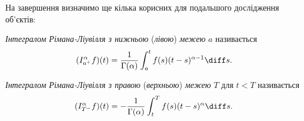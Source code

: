 На завершення визначимо ще кілька корисних для подальшого дослідження об'єктів:
\begin{definition}
    \textit{Інтегралом Рімана-Ліувілля з нижньою }(\textit{лівою})\textit{ межею} $a$ називається
    \begin{equation}
        (I_{a^+}^\alpha f)(t) = \frac{1}{\Gamma(\alpha)} \int_a^t f(s) (t - s)^{\alpha - 1} \diff s.
    \end{equation}
\end{definition}
\begin{definition}
    \textit{Інтегралом Рімана-Ліувілля з правою }(\textit{верхньою})\textit{ межею} $T$ для $t < T$ називається
    \begin{equation}
        (I_{T^-}^\alpha f)(t) = -\frac{1}{\Gamma(\alpha)} \int_t^T f(s) (t - s)^\alpha \diff s.
    \end{equation}
\end{definition}

